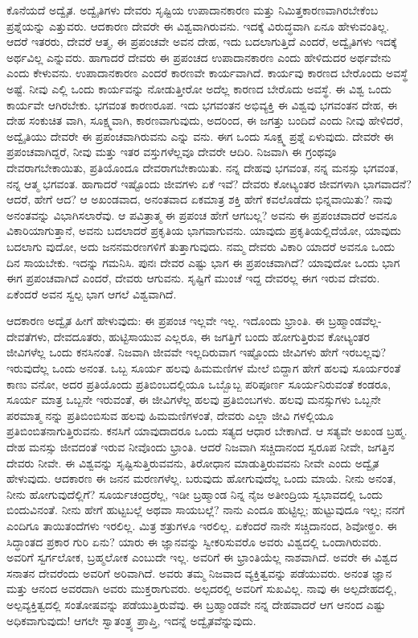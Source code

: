 ಕೊನೆಯದೆ ಅದ್ವೈತ. ಅದ್ವೈತಿಗಳು ದೇವರು ಸೃಷ್ಟಿಯ ಉಪಾದಾನಕಾರಣ ಮತ್ತು ನಿಮಿತ್ತಕಾರಣವಾಗಿರಬೇಕೆಂಬ ಪ್ರಶ್ನೆಯನ್ನು ಎತ್ತುವರು. ಆದಕಾರಣ ದೇವರೇ ಈ ವಿಶ್ವವಾಗಿರುವನು. ಇದಕ್ಕೆ ವಿರುದ್ಧವಾಗಿ ಏನೂ ಹೇಳುವಂತಿಲ್ಲ. ಆದರೆ ಇತರರು, ದೇವರೆ ಆತ್ಮ, ಈ ಪ್ರಪಂಚವೇ ಅವನ ದೇಹ, ಇದು ಬದಲಾಗುತ್ತಿದೆ ಎಂದರೆ, ಅದ್ವೈತಿಗಳು ಇದಕ್ಕೆ ಅರ್ಥವಿಲ್ಲ ಎನ್ನುವರು. ಹಾಗಾದರೆ ದೇವರು ಈ ಪ್ರಪಂಚದ ಉಪಾದಾನಕಾರಣ ಎಂದು ಹೇಳಿದುದರ ಅರ್ಥವೇನು ಎಂದು ಕೇಳುವನು. ಉಪಾದಾನಕಾರಣ ಎಂದರೆ ಕಾರಣವೇ ಕಾರ್ಯವಾಗಿದೆ. ಕಾರ್ಯವು ಕಾರಣದ ಬೇರೊಂದು ಅವಸ್ಥೆ ಅಷ್ಟೆ. ನೀವು ಎಲ್ಲಿ ಒಂದು ಕಾರ್ಯವನ್ನು ನೋಡುತ್ತೀರೋ ಅದೆಲ್ಲ ಕಾರಣದ ಬೇರೊದು ಅವಸ್ಥೆ. ಈ ವಿಶ್ವ ಒಂದು ಕಾರ್ಯವೇ ಆಗಿರಬೇಕು. ಭಗವಂತ ಕಾರಣರೂಪ. ಇದು ಭಗವಂತನ ಅಭಿವ್ಯಕ್ತಿ ಈ ವಿಶ್ವವು ಭಗವಂತನ ದೇಹ, ಈ ದೇಹ ಸಂಕುಚಿತ ವಾಗಿ, ಸೂಕ್ಷ್ಮವಾಗಿ, ಕಾರಣವಾಗುವುದು, ಅದರಿಂದ, ಈ ಜಗತ್ತು ಬಂದಿದೆ ಎಂದು ನೀವು ಹೇಳಿದರೆ, ಅದ್ವೈತಿಯು ದೇವರೇ ಈ ಪ್ರಪಂಚವಾಗಿರುವನು ಎನ್ನು ವನು. ಈಗ ಒಂದು ಸೂಕ್ಷ್ಮ ಪ್ರಶ್ನೆ ಏಳುವುದು. ದೇವರೇ ಈ ಪ್ರಪಂಚವಾಗಿದ್ದರೆ, ನೀವು ಮತ್ತು ಇತರ ವಸ್ತುಗಳೆಲ್ಲವೂ ದೇವರೇ ಆದಿರಿ. ನಿಜವಾಗಿ ಈ ಗ್ರಂಥವೂ ದೇವರಾಗಬೇಕಾಯಿತು, ಪ್ರತಿಯೊಂದೂ ದೇವರಾಗಬೇಕಾಯಿತು. ನನ್ನ ದೇಹವು ಭಗವಂತ, ನನ್ನ ಮನಸ್ಸು ಭಗವಂತ, ನನ್ನ ಆತ್ಮ ಭಗವಂತ. ಹಾಗಾದರೆ ಇಷ್ಟೊಂದು ಜೀವಗಳು ಏಕೆ ಇವೆ? ದೇವರು ಕೋಟ್ಯಂತರ ಜೀವಗಳಾಗಿ ಭಾಗವಾದನೆ? ಆದರೆ, ಹೇಗೆ ಆದ? ಆ ಅಖಂಡವಾದ, ಅನಂತವಾದ ಏಕಮಾತ್ರ ಶಕ್ತಿ ಹೇಗೆ ಕವಲೊಡೆದು ಭಿನ್ನವಾಯಿತು? ನಾವು ಅನಂತವನ್ನು ವಿಭಾಗಿಸಲಾರೆವು. ಆ ಪವಿತ್ರಾತ್ಮ ಈ ಪ್ರಪಂಚ ಹೇಗೆ ಆಗಬಲ್ಲ? ಅವನು ಈ ಪ್ರಪಂಚವಾದರೆ ಅವನೂ ವಿಕಾರಿಯಾಗುತ್ತಾನೆ, ಅವನು ಬದಲಾದರೆ ಪ್ರಕೃತಿಯ ಭಾಗವಾಗುವನು. ಯಾವುದು ಪ್ರಕೃತಿಯಲ್ಲಿದೆಯೋ, ಯಾವುದು ಬದಲಾಗು ವುದೋ, ಅದು ಜನನಮರಣಗಳಿಗೆ ತುತ್ತಾಗುವುದು. ನಮ್ಮ ದೇವರು ವಿಕಾರಿ ಯಾದರೆ ಅವನೂ ಒಂದು ದಿನ ಸಾಯಬೇಕು. ಇದನ್ನು ಗಮನಿಸಿ. ಪುನಃ ದೇವರ ಎಷ್ಟು ಭಾಗ ಈ ಪ್ರಪಂಚವಾಗಿದೆ? ಯಾವುದೋ ಒಂದು  ಭಾಗ ಈಗ ಪ್ರಪಂಚವಾಗಿದೆ ಎಂದರೆ, ದೇವರು  ಆಗುವನು. ಸೃಷ್ಟಿಗೆ ಮುಂಚೆ ಇದ್ದ ದೇವರಲ್ಲ ಈಗ ಇರುವ ದೇವರು. ಏಕೆಂದರೆ ಅವನ ಸ್ವಲ್ಪ ಭಾಗ ಆಗಲೆ ವಿಶ್ವವಾಗಿದೆ.

ಆದಕಾರಣ ಅದ್ವೈತ ಹೀಗೆ ಹೇಳುವುದು: ಈ ಪ್ರಪಂಚ ಇಲ್ಲವೇ ಇಲ್ಲ. ಇದೊಂದು ಭ್ರಾಂತಿ. ಈ ಬ್ರಹ್ಮಾಂಡವೆಲ್ಲ-ದೇವತೆಗಳು, ದೇವದೂತರು, ಹುಟ್ಟಿಸಾಯುವ ಎಲ್ಲರೂ, ಈ ಜಗತ್ತಿಗೆ ಬಂದು ಹೋಗುತ್ತಿರುವ ಕೋಟ್ಯಂತರ ಜೀವಿಗಳೆಲ್ಲ ಒಂದು ಕನಸಿನಂತೆ. ನಿಜವಾಗಿ ಜೀವವೇ ಇಲ್ಲದಿರುವಾಗ ಇಷ್ಟೊಂದು ಜೀವಿಗಳು ಹೇಗೆ ಇರಬಲ್ಲವು? ಇರುವುದೆಲ್ಲ ಒಂದು ಅನಂತ. ಒಬ್ಬ ಸೂರ್ಯ ಹಲವು ಹಿಮಮಣಿಗಳ ಮೇಲೆ ಬಿದ್ದಾಗ ಹೇಗೆ ಹಲವು ಸೂರ್ಯರಂತೆ ಕಾಣು ವನೋ, ಅದರ ಪ್ರತಿಯೊಂದು ಪ್ರತಿಬಿಂಬದಲ್ಲಿಯೂ ಒಬ್ಬೊಬ್ಬ ಪರಿಪೂರ್ಣ ಸೂರ್ಯನಿರುವಂತೆ ಕಂಡರೂ, ಸೂರ್ಯ ಮಾತ್ರ ಒಬ್ಬನೇ ಇರುವಂತೆ, ಈ ಜೀವಿಗಳೆಲ್ಲ ಹಲವು ಪ್ರತಿಬಿಂಬಗಳು. ಹಲವು ಮನಸ್ಸುಗಳು ಒಬ್ಬನೇ ಪರಮಾತ್ಮ ನನ್ನು ಪ್ರತಿಬಿಂಬಿಸುವ ಹಲವು ಹಿಮಮಣಿಗಳಂತೆ, ದೇವರು ಎಲ್ಲಾ ಜೀವಿ ಗಳಲ್ಲಿಯೂ ಪ್ರತಿಬಿಂಬಿತನಾಗುತ್ತಿರುವನು. ಕನಸಿಗೆ ಯಾವುದಾದರೂ ಒಂದು ಸತ್ಯದ ಆಧಾರ ಬೇಕಾಗಿದೆ. ಆ ಸತ್ಯವೇ ಅಖಂಡ ಬ್ರಹ್ಮ. ದೇಹ ಮನಸ್ಸು ಜೀವದಂತೆ ಇರುವ ನೀವೊಂದು ಭ್ರಾಂತಿ. ಆದರೆ ನಿಜವಾಗಿ ಸಚ್ಚಿದಾನಂದ ಸ್ವರೂಪ ನೀವೇ, ಜಗತ್ತಿನ ದೇವರು ನೀವೇ. ಈ ವಿಶ್ವವನ್ನು ಸೃಷ್ಟಿಸುತ್ತಿರುವವನು, ತಿರೋಧಾನ ಮಾಡುತ್ತಿರುವವನು ನೀವೇ ಎಂದು ಅದ್ವೈತ ಹೇಳುವುದು. ಆದಕಾರಣ ಈ ಜನನ ಮರಣಗಳೆಲ್ಲ. ಬರುವುದು ಹೋಗುವುದೆಲ್ಲ ಒಂದು ಮಾಯೆ. ನೀನು ಅನಂತ, ನೀನು ಹೋಗುವುದೆಲ್ಲಿಗೆ? ಸೂರ್ಯಚಂದ್ರರೆಲ್ಲ, ಇಡೀ ಬ್ರಹ್ಮಾಂಡ ನಿನ್ನ ನೈಜ ಅತೀಂದ್ರಿಯ ಸ್ವಭಾವದಲ್ಲಿ ಒಂದು ಬಿಂದುವಿನಂತೆ. ನೀನು ಹೇಗೆ ಹುಟ್ಟಬಲ್ಲೆ ಅಥವಾ ಸಾಯಬಲ್ಲೆ? ನಾನು ಎಂದೂ ಹುಟ್ಟಿಲ್ಲ; ಹುಟ್ಟುವುದೂ ಇಲ್ಲ; ನನಗೆ ಎಂದಿಗೂ ತಾಯಿತಂದೆಗಳು ಇರಲಿಲ್ಲ. ಮಿತ್ರ ಶತ್ರುಗಳೂ ಇರಲಿಲ್ಲ. ಏಕೆಂದರೆ ನಾನೇ ಸಚ್ಚಿದಾನಂದ, ಶಿವೋಠ್ಹಂ. ಈ ಸಿದ್ಧಾಂತದ ಪ್ರಕಾರ ಗುರಿ ಏನು? ಯಾರು ಈ ಜ್ಞಾನವನ್ನು ಸ್ವೀಕರಿಸುವರೊ ಅವರು ವಿಶ್ವದಲ್ಲಿ ಒಂದಾಗಿರುವರು. ಅವರಿಗೆ ಸ್ವರ್ಗಲೋಕ, ಬ್ರಹ್ಮಲೋಕ ಎಂಬುದೇ ಇಲ್ಲ. ಅವರಿಗೆ ಈ ಭ್ರಾಂತಿಯೆಲ್ಲ ನಾಶವಾಗಿದೆ. ಅವರೇ ಈ ವಿಶ್ವದ ಸನಾತನ ದೇವರೆಂದು ಅವರಿಗೆ ಅರಿವಾಗಿದೆ. ಅವರು ತಮ್ಮ ನಿಜವಾದ ವ್ಯಕ್ತಿತ್ವವನ್ನು ಪಡೆಯುವರು. ಅನಂತ ಜ್ಞಾನ ಮತ್ತು ಆನಂದ ಅವರದಾಗಿ ಅವರು ಮುಕ್ತರಾಗುವರು. ಅಲ್ಪದರಲ್ಲಿ ಅವರಿಗೆ ಸುಖವಿಲ್ಲ. ನಾವು ಈ ಅಲ್ಪದೇಹದಲ್ಲಿ, ಅಲ್ಪವ್ಯಕ್ತಿತ್ವದಲ್ಲಿ ಸಂತೋಷವನ್ನು ಪಡೆಯುತ್ತಿರುವೆವು. ಈ ಬ್ರಹ್ಮಾಂಡವೇ ನನ್ನ ದೇಹವಾದರೆ ಆಗ ಆನಂದ ಎಷ್ಟು ಅಧಿಕವಾಗುವುದು! ಆಗಲೇ ಸ್ವಾತಂತ್ರ್ಯ ಪ್ರಾಪ್ತಿ, ಇದನ್ನೆ ಅದ್ವೈತವೆನ್ನುವುದು.

